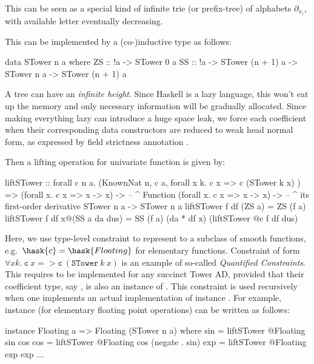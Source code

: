 This can be seen as a special kind of infinite trie (or prefix-tree) of alphabets $\partial_{x_i}$, with available letter eventually decreasing.

This can be implemented by a (co-)inductive type as follows:

\begin{code}
data STower n a where
  ZS :: !a -> STower 0 a
  SS :: !a -> STower (n + 1) a -> STower n a
     -> STower (n + 1) a
\end{code}

A tree can have an \emph{infinite height}.
Since Haskell is a lazy language, this won't eat up the memory and only necessary information will be gradually allocated.
Since making everything lazy can introduce a huge space leak, we force each coefficient  when their corresponding data constructors are reduced to weak head normal form, as expressed by field strictness annotation .

Then a lifting operation for univariate function is given by:

\begin{code}
liftSTower :: forall c n a.
  (KnownNat n, c a, forall x k. c x => c (STower k x) ) =>
  (forall x. c x => x -> x) ->
    -- ^ Function
  (forall x. c x => x -> x) ->
    -- ^ its first-order derivative
  STower n a ->
  STower n a
liftSTower f df (ZS a) = ZS (f a)
liftSTower f df x@(SS a da dus) 
  = SS (f a) (da * df x) (liftSTower @c f df dus)
\end{code}

Here, we use type-level constraint  to represent to a subclass of smooth functions, e.g.\ $\hask{c} = \hask{Floating}$ for elementary functions.
Constraint of form $\forall x k.\ \texttt{c}\ x => \texttt{c}\ (\texttt{STower}\ k\ x)$ is an example of so-called \emph{Quantified Constraints}.
This requires  to be implemented for any succinct Tower AD, provided that their coefficient type, say , is also an instance of .
This constraint is used recursively when one implements an actual implementation of instance .
For example,  instance (for elementary floating point operations) can be written as follows:

\begin{code}
instance Floating a => Floating (STower n a) where
  sin = liftSTower @Floating sin cos
  cos = liftSTower @Floating cos (negate . sin)
  exp = liftSTower @Floating exp exp
  ...
\end{code}

